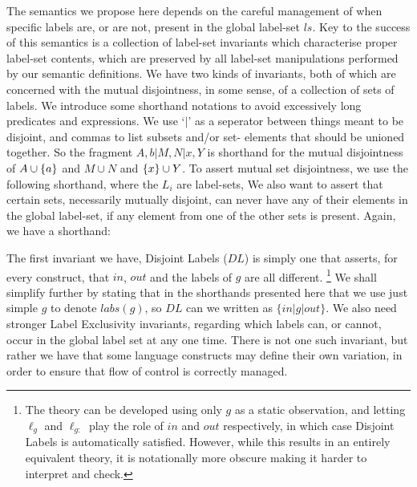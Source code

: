 The semantics we propose here depends on the careful management
of when specific labels are, or are not,
present in the global label-set $ls$.
Key to the success of this semantics is a collection of label-set invariants
which characterise proper label-set contents,
which are preserved by all label-set manipulations performed
by our semantic definitions.
We have two kinds of invariants,
both of which are concerned with the mutual disjointness, in some sense,
of a collection of sets of labels.
We introduce some shorthand notations
to avoid excessively long predicates and expressions.
We use `$\mid$' as a seperator between things meant to be disjoint,
and commas to list subsets and/or set- elements that should be unioned together.
So the fragment $ A,b | M,N | x,Y $
is shorthand for the mutual disjointness of
$A \cup \{{a}\}$ and $M \cup N$ and $\{{x}\} \cup Y$.
To assert mutual set disjointness,
we use the following shorthand, where the $L_i$ are label-sets,
We also want to assert that certain sets, necessarily mutually disjoint,
can never have any of their elements in the global label-set,
if any element from one of the other sets is present.
Again, we have a shorthand:

The first invariant we have, Disjoint Labels ($DL$) is simply one that asserts,
for every construct, that $in$, $out$ and the labels of $g$
are all different.
\footnote{The theory can be developed using only $g$ as a static observation,
and letting $\ell_g$ and $\ell_{g:}$ play the role of $in$ and $out$
respectively, in which case Disjoint Labels is automatically satisfied.
However, while this results in an entirely equivalent theory,
it is notationally more obscure
making it harder to interpret and check.
}%
We shall simplify further by stating that in the shorthands presented
here that we use just simple $g$ to denote $labs(g)$,
so $DL$ can we written as $\{in|g|out\}$.
We also need stronger Label Exclusivity invariants,
regarding which labels can, or cannot,
occur in the global label set at any one time.
There is not one such invariant,
but rather we have that some language constructs may define their own
variation, in order to ensure that flow of control is correctly managed.

